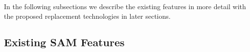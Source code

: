 \documentclass[../main-v1.tex]{subfiles}
\begin{document}


 






In the following subsections we describe the existing features in more detail with the proposed replacement technologies in %
later sections. 

\subsection{Existing SAM  Features}
\end{document}

